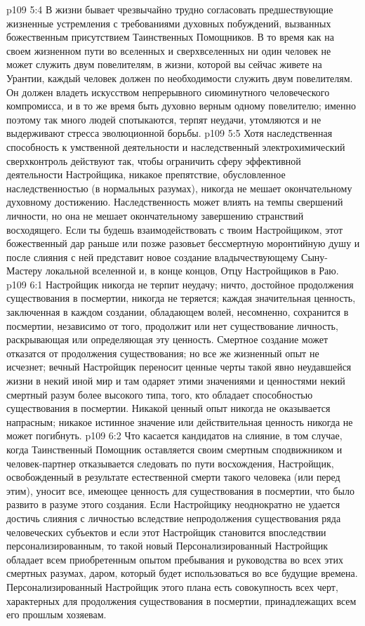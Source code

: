 \vs p109 5:4 \pc В жизни бывает чрезвычайно трудно согласовать предшествующие жизненные устремления с требованиями духовных побуждений, вызванных божественным присутствием Таинственных Помощников. В то время как на своем жизненном пути во вселенных и сверхвселенных ни один человек не может служить двум повелителям, в жизни, которой вы сейчас живете на Урантии, каждый человек должен по необходимости служить двум повелителям. Он должен владеть искусством непрерывного сиюминутного человеческого компромисса, и в то же время быть духовно верным одному повелителю; именно поэтому так много людей спотыкаются, терпят неудачи, утомляются и не выдерживают стресса эволюционной борьбы.
\vs p109 5:5 Хотя наследственная способность к умственной деятельности и наследственный электрохимический сверхконтроль действуют так, чтобы ограничить сферу эффективной деятельности Настройщика, никакое препятствие, обусловленное наследственностью (в нормальных разумах), никогда не мешает окончательному духовному достижению. Наследственность может влиять на темпы свершений личности, но она не мешает окончательному завершению странствий восходящего. Если ты будешь взаимодействовать с твоим Настройщиком, этот божественный дар раньше или позже разовьет бессмертную моронтийную душу и после слияния с ней представит новое создание владычествующему Сыну\hyp{}Мастеру локальной вселенной и, в конце концов, Отцу Настройщиков в Раю.
\vs p109 6:1 Настройщик никогда не терпит неудачу; ничто, достойное продолжения существования в посмертии, никогда не теряется; каждая значительная ценность, заключенная в каждом создании, обладающем волей, несомненно, сохранится в посмертии, независимо от того, продолжит или нет существование личность, раскрывающая или определяющая эту ценность. Смертное создание может отказатся от продолжения существования; но все же жизненный опыт не исчезнет; вечный Настройщик переносит ценные черты такой явно неудавшейся жизни в некий иной мир и там одаряет этими значениями и ценностями некий смертный разум более высокого типа, того, кто обладает способностью существования в посмертии. Никакой ценный опыт никогда не оказывается напрасным; никакое истинное значение или действительная ценность никогда не может погибнуть.
\vs p109 6:2 Что касается кандидатов на слияние, в том случае, когда Таинственный Помощник оставляется своим смертным сподвижником и человек\hyp{}партнер отказывается следовать по пути восхождения, Настройщик, освобожденный в результате естественной смерти такого человека (или перед этим), уносит все, имеющее ценность для существования в посмертии, что было развито в разуме этого создания. Если Настройщику неоднократно не удается достичь слияния с личностью вследствие непродолжения существования ряда человеческих субъектов и если этот Настройщик становится впоследствии персонализированным, то такой новый Персонализированный Настройщик обладает всем приобретенным опытом пребывания и руководства во всех этих смертных разумах, даром, который будет использоваться во все будущие времена. Персонализированный Настройщик этого плана есть совокупность всех черт, характерных для продолжения существования в посмертии, принадлежащих всем его прошлым хозяевам.
